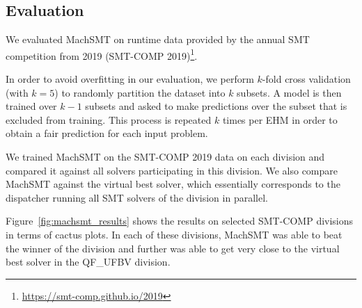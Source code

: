 \documentclass{article}
\begin{document}
\subsection{Evaluation}

We evaluated MachSMT on runtime data provided by the annual SMT competition
from 2019 (SMT-COMP 2019)\footnote{\url{https://smt-comp.github.io/2019}}.

In order to avoid overfitting in our evaluation, we perform $k$-fold cross
validation (with $k = 5$) to randomly partition the dataset into $k$ subsets.
A model is then trained over $k - 1$ subsets and asked to make predictions over
the subset that is excluded from training.
This process is repeated $k$ times per EHM in order to obtain a fair prediction
for each input problem.

We trained MachSMT on the SMT-COMP 2019 data on each division and compared
it against all solvers participating in this division.
We also compare MachSMT against the virtual best solver, which essentially
corresponds to the dispatcher running all SMT solvers of the division in
parallel.

Figure~\ref{fig:machsmt_results} shows the results on selected SMT-COMP
divisions in terms of cactus plots.
In each of these divisions, MachSMT was able to beat the winner of the division
and further was able to get very close to the virtual best solver in the
QF\_UFBV division.
\end{document}
